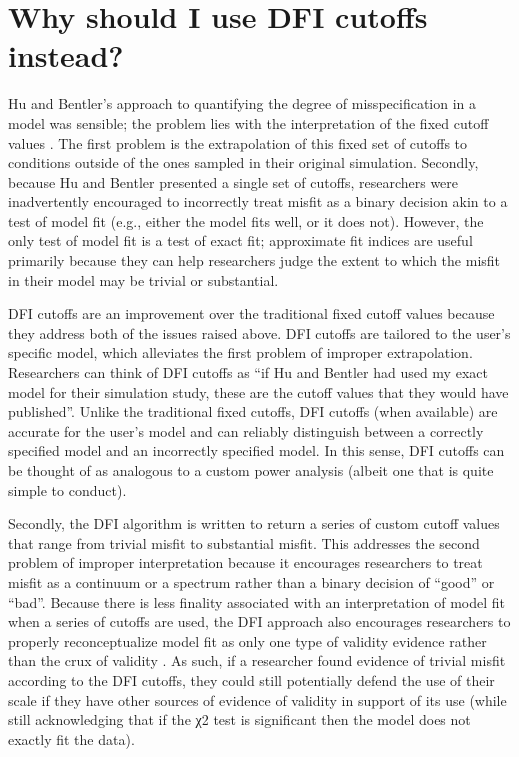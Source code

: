 \documentclass[
]{book}
\begin{document}
\hypertarget{why-dfi}{%
\chapter{Why should I use DFI cutoffs instead?}\label{why-dfi}}

Hu and Bentler's approach to quantifying the degree of misspecification in a model was sensible; the problem lies with the interpretation of the fixed cutoff values \citep{millsap_structural_2007, pornprasertmanit_monte_2013}. The first problem is the extrapolation of this fixed set of cutoffs to conditions outside of the ones sampled in their original simulation. Secondly, because Hu and Bentler presented a single set of cutoffs, researchers were inadvertently encouraged to incorrectly treat misfit as a binary decision akin to a test of model fit (e.g., either the model fits well, or it does not). However, the only test of model fit is a test of exact fit; approximate fit indices are useful primarily because they can help researchers judge the extent to which the misfit in their model may be trivial or substantial.

DFI cutoffs are an improvement over the traditional fixed cutoff values because they address both of the issues raised above. DFI cutoffs are tailored to the user's specific model, which alleviates the first problem of improper extrapolation. Researchers can think of DFI cutoffs as ``if Hu and Bentler had used my exact model for their simulation study, these are the cutoff values that they would have published''. Unlike the traditional fixed cutoffs, DFI cutoffs (when available) are accurate for the user's model and can reliably distinguish between a correctly specified model and an incorrectly specified model. In this sense, DFI cutoffs can be thought of as analogous to a custom power analysis (albeit one that is quite simple to conduct).

Secondly, the DFI algorithm is written to return a series of custom cutoff values that range from trivial misfit to substantial misfit. This addresses the second problem of improper interpretation because it encourages researchers to treat misfit as a continuum or a spectrum rather than a binary decision of ``good'' or ``bad''. Because there is less finality associated with an interpretation of model fit when a series of cutoffs are used, the DFI approach also encourages researchers to properly reconceptualize model fit as only one type of validity evidence rather than the crux of validity \citep{aera_apa_ncme_standards_2014}. As such, if a researcher found evidence of trivial misfit according to the DFI cutoffs, they could still potentially defend the use of their scale if they have other sources of evidence of validity in support of its use (while still acknowledging that if the χ2 test is significant then the model does not exactly fit the data).
\end{document}

